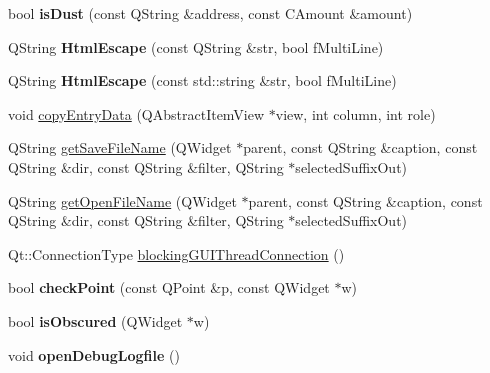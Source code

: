 \begin{DoxyCompactItemize}
\mbox{\label{namespace_g_u_i_util_af72fd9408f5cc4f11f6adb4dd533aa40}} 
bool {\bfseries is\+Dust} (const Q\+String \&address, const C\+Amount \&amount)
\item 
\mbox{\label{namespace_g_u_i_util_a2d4b7f2c11ebc4b97af10bc20d19b1b2}} 
Q\+String {\bfseries Html\+Escape} (const Q\+String \&str, bool f\+Multi\+Line)
\item 
\mbox{\label{namespace_g_u_i_util_ad6086df566cf2cb7f699a24e099dc59c}} 
Q\+String {\bfseries Html\+Escape} (const std\+::string \&str, bool f\+Multi\+Line)
\item 
void \mbox{\hyperlink{namespace_g_u_i_util_aad7852433ad4953a9bcae9a6e735b2d4}{copy\+Entry\+Data}} (Q\+Abstract\+Item\+View $\ast$view, int column, int role)
\item 
Q\+String \mbox{\hyperlink{namespace_g_u_i_util_a788c51092a2255b1f8976d4794fc3ee6}{get\+Save\+File\+Name}} (Q\+Widget $\ast$parent, const Q\+String \&caption, const Q\+String \&dir, const Q\+String \&filter, Q\+String $\ast$selected\+Suffix\+Out)
\item 
Q\+String \mbox{\hyperlink{namespace_g_u_i_util_a644a552cbcaf32591bb2cc59167ee61e}{get\+Open\+File\+Name}} (Q\+Widget $\ast$parent, const Q\+String \&caption, const Q\+String \&dir, const Q\+String \&filter, Q\+String $\ast$selected\+Suffix\+Out)
\item 
Qt\+::\+Connection\+Type \mbox{\hyperlink{namespace_g_u_i_util_a2046fc343a70996c23cae6fe7f8d94f2}{blocking\+G\+U\+I\+Thread\+Connection}} ()
\item 
\mbox{\label{namespace_g_u_i_util_ab2e7ef0aa9a1ad3f86d67a3f596b6fc4}} 
bool {\bfseries check\+Point} (const Q\+Point \&p, const Q\+Widget $\ast$w)
\item 
\mbox{\label{namespace_g_u_i_util_a0b7266e2b8e7de5f5fd1c7ddb9e5b637}} 
bool {\bfseries is\+Obscured} (Q\+Widget $\ast$w)
\item 
\mbox{\label{namespace_g_u_i_util_aad169e3227e7a851db52a08bfb30391c}} 
void {\bfseries open\+Debug\+Logfile} ()
\item 
\mbox{\label{namespace_g_u_i_util_a995fae29ee632b8b0810b840d3d06bf1}} 

\end{DoxyCompactItemize}
